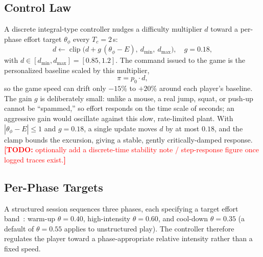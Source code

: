 \documentclass[journal,10pt]{IEEEtran}
\newcommand{\todoNote}[1]{\textcolor{red}{\textbf{[TODO:} #1\textbf{]}}}
\newcommand{\clip}{\operatorname{clip}}
\begin{document}
\subsection{Control Law}
A discrete integral-type controller nudges a difficulty multiplier $d$ toward a
per-phase effort target $\theta_\phi$ every $T_c=2$\,s:
\begin{equation}
d\leftarrow \clip\!\bigl(d+g\,(\theta_\phi-E),\ d_{\min},\ d_{\max}\bigr),
\quad g=0.18,
\label{eq:control}
\end{equation}
with $d\in[d_{\min},d_{\max}]=[0.85,1.2]$. The command issued to the game is the
personalized baseline scaled by this multiplier,
\begin{equation}
\pi = p_0\cdot d,
\end{equation}
so the game speed can drift only $-15\%$ to $+20\%$ around each player's baseline.
The gain $g$ is deliberately small: unlike a mouse, a real jump, squat, or
push-up cannot be ``spammed,'' so effort responds on the time scale of seconds;
an aggressive gain would oscillate against this slow, rate-limited plant. With
$|\theta_\phi-E|\le1$ and $g=0.18$, a single update moves $d$ by at most $0.18$,
and the clamp bounds the excursion, giving a stable, gently critically-damped
response. \todoNote{optionally add a discrete-time stability note / step-response
figure once logged traces exist.}

\subsection{Per-Phase Targets}
A structured session sequences three phases, each specifying a target effort
band~\cite{fitarcade-sdps}: warm-up $\theta=0.40$, high-intensity $\theta=0.60$,
and cool-down $\theta=0.35$ (a default of $\theta=0.55$ applies to unstructured
play). The controller therefore regulates the player toward a phase-appropriate
relative intensity rather than a fixed speed.
\end{document}
